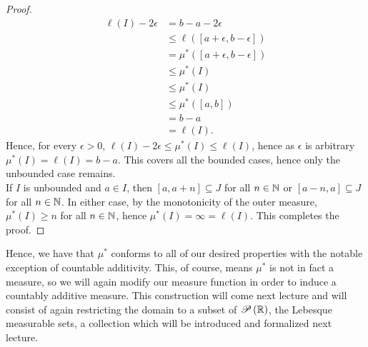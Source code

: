 \begin{proof}
	\begin{align*}
		\ell\left( I \right) - 2\epsilon &= b - a - 2\epsilon \\
						 &\le \ell \left( \left[ a + \epsilon, b - \epsilon \right]  \right) \\
						 &=  \mu^{*}\left( \left[ a + \epsilon, b - \epsilon \right]  \right)  \\
						 &\le \mu^{*}\left( I \right)\\
						 &\le \mu^{*}\left( I \right) \\
						 &\le \mu^{*}\left( \left[ a, b \right]  \right) \\
						 &= b -a \\
						 &= \ell\left( I \right)
	.\end{align*}
	Hence, for every \(\epsilon > 0\), \(\ell\left( I \right)  - 2\epsilon \le \mu^{*}\left( I \right)  \le \ell \left( I \right) \), hence as \(\epsilon\) is arbitrary \( \mu^{*} \left( I \right)  = \ell \left( I \right) = b-a \). This covers all the bounded cases, hence only the unbounded case remains.\\
	If \(I\) is unbounded and \(a \in I\), then \(\left[ a, a+n \right] \subseteq J\) for all \(n \in \mathbb{N}\) or \(\left[ a- n, a \right] \subseteq J\) for all \(n \in \mathbb{N}\). In either case, by the monotonicity of the outer measure,  \( \mu^{*}\left( I \right)  \ge n\) for all \(n \in \mathbb{N}\), hence \( \mu^{*}\left( I \right)  = \infty = \ell \left( I \right) \). This completes the proof.
\end{proof}
Hence, we have that \( \mu^{*}\) conforms to all of our desired properties with the notable exception of countable additivity. This, of course, means \( \mu^{*}\) is not in fact a measure, so we will again modify our measure function in order to induce a countably additive measure. This construction will come next lecture and will consist of again restricting the domain to a subset of \(\mathscr{P}\left( \mathbb{R} \right) \), the Lebesque measurable sets, a collection which will be introduced and formalized next lecture.
